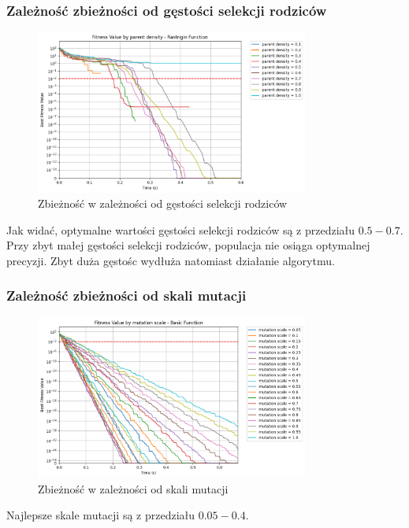 \documentclass{article}
\begin{document}
\subsubsection*{Zależność zbieżności od gęstości selekcji rodziców}
\begin{figure}[H]
    \centering
    \includegraphics[width=0.8\textwidth]{img/ae1/parent_density.png}
    \caption{Zbieżność w zależności od gęstości selekcji rodziców}
\end{figure}
Jak widać, optymalne wartości gęstości selekcji rodziców są z przedziału $0.5 - 0.7$. Przy zbyt małej gęstości selekcji rodziców, populacja nie osiąga optymalnej precyzji. Zbyt duża gęstośc wydłuża natomiast działanie algorytmu.

\subsubsection*{Zależność zbieżności od skali mutacji}
\begin{figure}[H]
    \centering
    \includegraphics[width=0.8\textwidth]{img/ae1/mutation_scale.png}
    \caption{Zbieżność w zależności od skali mutacji}
\end{figure}

Najlepsze skale mutacji są z przedziału $0.05 - 0.4$.
\newpage
\end{document}
